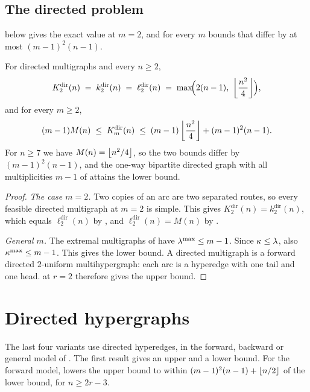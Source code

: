 \subsection{The directed problem}\label{sec:multi-vertex-dir}

 below gives the exact value at $m=2$, and for every $m$ bounds that differ by at most $(m-1)^2(n-1)$.

\begin{corollary}\label{cor:dir-multi-incidence}
For directed multigraphs and every $n \ge 2$,
\[
    K_2^{\mathrm{dir}}(n) \;=\; k_2^{\mathrm{dir}}(n) \;=\; \ell_2^{\mathrm{dir}}(n)
    \;=\; \max\!\Bigl(2(n-1),\ \left\lfloor \frac{n^2}{4} \right\rfloor\Bigr) ,
\]
and for every $m \ge 2$,
\[
    (m-1)M(n) \;\le\; K_m^{\mathrm{dir}}(n)
    \;\le\; (m-1)\left\lfloor \frac{n^2}{4} \right\rfloor + (m-1)^2(n-1) .
\]
For $n\ge7$ we have $M(n)=\left\lfloor n^2/4 \right\rfloor$, so the two bounds differ by $(m-1)^2(n-1)$, and the one-way bipartite directed graph with all multiplicities $m-1$ of  attains the lower bound.
\end{corollary}

\begin{proof}
\emph{The case $m=2$.}
Two copies of an arc are two separated routes, so every feasible directed multigraph at $m=2$ is simple.
This gives $K_2^{\mathrm{dir}}(n) = k_2^{\mathrm{dir}}(n)$, which equals $\ell_2^{\mathrm{dir}}(n)$ by , and $\ell_2^{\mathrm{dir}}(n) = M(n)$ by .

\emph{General $m$.}
The extremal multigraphs of  have $\lambda^{\max} \le m-1$. Since $\kappa\le\lambda$, also $\kappa^{\max} \le m-1$. This gives the lower bound.
A directed multigraph is a forward directed $2$-uniform multihypergraph: each arc is a hyperedge with one tail and one head.
 at $r=2$ therefore gives the upper bound.
\end{proof}

\section{Directed hypergraphs}\label{sec:dir-hyper}

The last four variants use directed hyperedges, in the forward, backward or general model of .
The first result gives an upper and a lower bound.
For the forward model,  lowers the upper bound to within $(m-1)^2(n-1)+\left\lfloor n/2 \right\rfloor$ of the lower bound, for $n\ge2r-3$.

